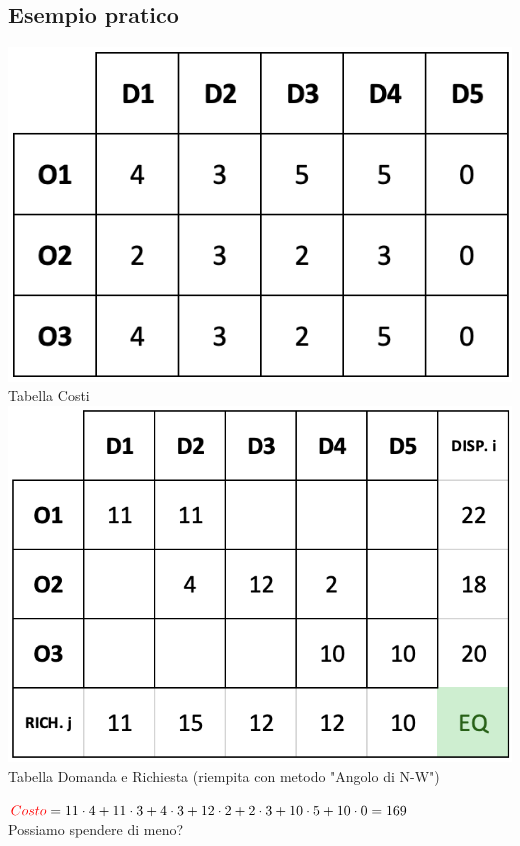 \documentclass[12pt,a4paper]{article}
\begin{document}
\subsection{Esempio pratico}
\begin{center}
\includegraphics[width=0.4\columnwidth]{img/prob_trasporto_costi.png}\\
Tabella Costi\\
\includegraphics[width=0.4\columnwidth]{img/prob_trasporto_DR.png}\\
Tabella Domanda e Richiesta (riempita con metodo "Angolo di N-W")
\end{center}
$\textcolor{red}{Costo} = 11\cdot 4 + 11\cdot 3+ 4\cdot 3 +  12\cdot 2 + 2\cdot 3+ 10\cdot 5+10\cdot 0 = 169$\\
Possiamo spendere di meno?
\end{document}
